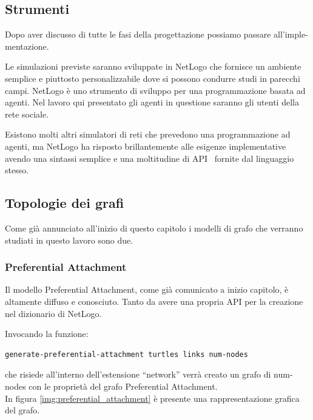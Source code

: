 \subsection{Strumenti}


Dopo aver discusso di tutte le fasi della progettazione possiamo passare all'imple-mentazione.

Le simulazioni previste saranno sviluppate in NetLogo che fornisce un ambiente semplice e piuttosto 
personalizzabile dove si possono condurre studi in parecchi campi.
NetLogo è uno strumento di sviluppo per una programmazione basata ad agenti.
Nel lavoro qui presentato gli agenti in questione saranno gli utenti della rete sociale.

Esistono molti altri simulatori di reti che prevedono una programmazione ad agenti, ma NetLogo
ha risposto brillantemente alle esigenze implementative avendo una sintassi semplice e una moltitudine di
API~\cite{biblio:netlogo_dictionary} fornite dal linguaggio stesso.


\subsection{Topologie dei grafi}
\label{section:graph_topologies}


Come già annunciato all'inizio di questo capitolo i modelli di grafo che verranno studiati in questo lavoro
sono due.


\subsubsection{Preferential Attachment}
\label{section:graph_topologies_pa}
Il modello Preferential Attachment, come già comunicato a inizio capitolo, è altamente diffuso e conosciuto.
Tanto da avere una propria API per la creazione nel dizionario di NetLogo.

Invocando la funzione:
\begin{lstlisting}[label=some-code, style=custom_code]
 generate-preferential-attachment turtles links num-nodes
\end{lstlisting}

che risiede all'interno dell'estensione ``network'' verrà creato un grafo di num-nodes con le proprietà 
del grafo Preferential Attachment.\\
In figura \ref{img:preferential_attachment} è presente una rappresentazione grafica del grafo.

